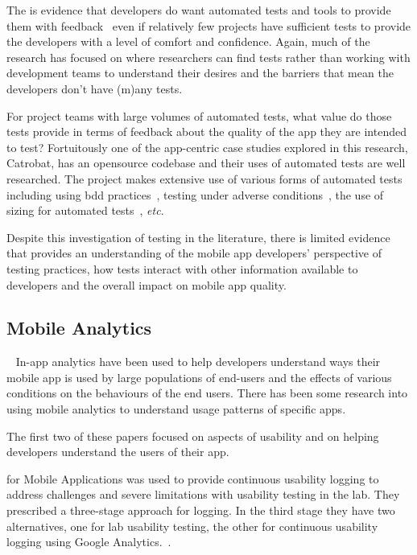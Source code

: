 The is evidence that developers do want automated tests and tools to provide them with feedback~ even if relatively few projects have sufficient tests to provide the developers with a level of comfort and confidence. Again, much of the research has focused on where researchers can find tests rather than working with development teams to understand their desires and the barriers that mean the developers don't have (m)any tests. 

For project teams with large volumes of automated tests, what value do those tests provide in terms of feedback about the quality of the app they are intended to test? Fortuitously one of the app-centric case studies explored in this research, Catrobat, has an opensource codebase and their uses of automated tests are well researched. The  project makes extensive use of various forms of automated tests including using \Gls{bdd} practices~, testing under adverse conditions~, the use of sizing for automated tests~, \emph{etc}. %

Despite this investigation of testing in the literature, there is limited evidence that provides an understanding of the mobile app developers' perspective of testing practices, how tests interact with other information available to developers and the overall impact on mobile app quality.

\subsection{Mobile Analytics}~\label{rw-mobile-analytics-topic}
In-app analytics have been used to help developers understand ways their mobile app is used by large populations of end-users and the effects of various conditions on the behaviours of the end users. There has been some research into using mobile analytics to understand usage patterns of specific apps.

The first two of these papers focused on aspects of usability and on helping developers understand the users  of their app.

 for Mobile Applications was used to provide continuous usability logging to address challenges and severe limitations with usability testing in the lab. They prescribed a three-stage approach for logging. In the third stage they have two alternatives, one for lab usability testing, the other for continuous usability logging using Google Analytics.~.

